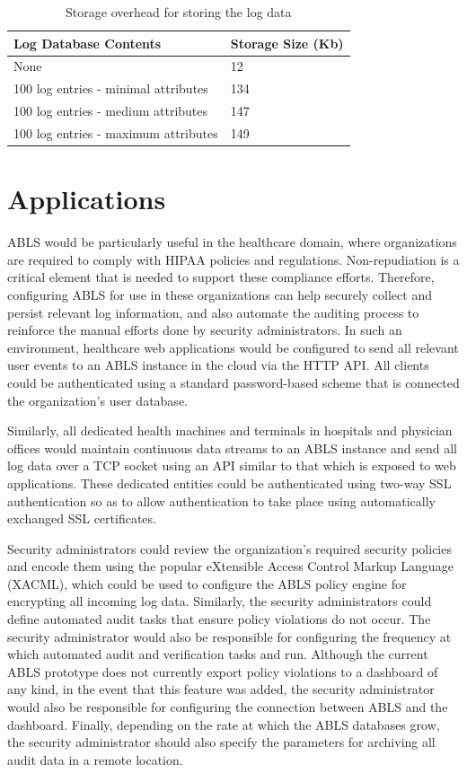 \documentclass{sig-alternate}
\begin{document}
\begin{table}
\label{tab:storage}
\caption{Storage overhead for storing the log data}
  \begin{tabular}{|l|l|}
    \hline
    Log Database Contents & Storage Size (Kb) \\ \hline
    None & 12 \\ 
    100 log entries - minimal attributes & 134 \\ 
    100 log entries - medium attributes & 147 \\ 
    100 log entries - maximum attributes & 149 \\
    \hline
  \end{tabular}
\end{table}

\section{Applications}
ABLS would be particularly useful in the healthcare domain, where organizations are required to comply with HIPAA policies
and regulations. Non-repudiation is a critical element that is needed to support these compliance efforts. Therefore,
configuring ABLS for use in these organizations can help securely collect and persist relevant log information, and 
also automate the auditing process to reinforce the manual efforts done by security administrators. In such an environment,
healthcare web applications would be configured to send all relevant user events to an ABLS instance in the cloud
via the HTTP API. All clients could be authenticated using a standard password-based scheme that is connected
the organization's user database.

Similarly, all dedicated health machines and terminals in hospitals and physician offices would maintain continuous 
data streams to an ABLS instance and send all log data over a TCP socket using an API similar to that which is exposed to
web applications. These dedicated entities could be authenticated using two-way SSL authentication so as to allow authentication
to take place using automatically exchanged SSL certificates.

Security administrators could review the organization's required security policies and encode them using the popular eXtensible
Access Control Markup Language (XACML), which could be used to configure the ABLS policy engine for encrypting all incoming log data.
Similarly, the security administrators could define automated audit tasks that ensure policy violations do not occur. The security
administrator would also be responsible for configuring the frequency at which automated audit and verification tasks and run. 
Although the current ABLS prototype does not currently export policy violations to a dashboard of any kind, in the event that 
this feature was added, the security administrator would also be responsible for configuring the connection between ABLS and the 
dashboard. Finally, depending on the rate at which the ABLS databases grow, the security administrator should also specify the 
parameters for archiving all audit data in a remote location. 
\end{document}
